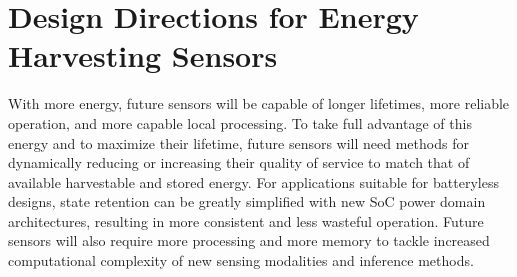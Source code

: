 %
%
%

\section{Design Directions for Energy Harvesting Sensors}
With more energy, future sensors will be capable of longer lifetimes, more reliable operation, and more capable local processing. To take full advantage of this energy and to maximize their lifetime, future sensors will need methods for dynamically reducing or increasing their quality of service to match that of available harvestable and stored energy.
For applications suitable for batteryless designs, state retention can be greatly simplified with new SoC power domain architectures, resulting in more consistent and less wasteful operation. Future sensors will also require more processing and more memory to tackle increased computational complexity of new sensing modalities and inference methods.

